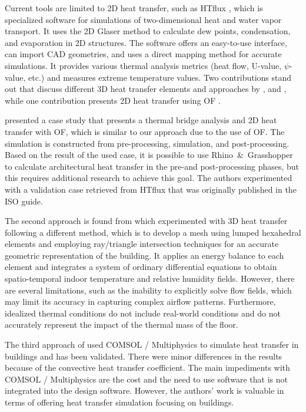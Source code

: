 Current tools are limited to 2D heat transfer, such as HTflux \cite{HTflux}, which is specialized software for simulations of two-dimensional heat and water vapor transport.
It uses the 2D Glaser method \cite{glaser1959graphisches} to calculate dew points, condensation, and evaporation in 2D structures. 
The software offers an easy-to-use interface, can import \gls{CAD} geometries, and uses a direct mapping method for accurate simulations. 
It provides various thermal analysis metrics (heat flow, U-value, $\psi$-value, etc.) and measures extreme temperature values. Two contributions stand out that discuss different 3D heat transfer elements and approaches by  \citeauthor{Yang} \cite{Yang}, and \citeauthor{COMSOL} \cite{COMSOL}, while one contribution presents 2D heat transfer using \gls{OF} \cite{kastner2020solving}.

\citeauthor{kastner2020solving} \cite{kastner2020solving} presented a case study that presents a thermal bridge analysis and 2D heat transfer with \gls{OF}, which is similar to our approach due to the use of \gls{OF}. The simulation is constructed from pre-processing, simulation, and post-processing. 
Based on the result of the used case, it is possible to use Rhino\ \&\ Grasshopper to calculate architectural heat transfer in the pre-and post-processing phases, but this requires additional research to achieve this goal. 
The authors experimented with a validation case retrieved from HTflux that was originally published in the ISO guide. 

The second approach is found from \citeauthor{Yang} \cite{Yang} which experimented with 3D heat transfer following a different method, which is to develop a mesh using lumped hexahedral elements and employing ray/triangle intersection techniques for an accurate geometric representation of the building. 
It applies an energy balance to each element and integrates a system of ordinary differential equations to obtain spatio-temporal indoor temperature and relative humidity fields. 
However, there are several limitations, such as the inability to explicitly solve flow fields, which may limit its accuracy in capturing complex airflow patterns. 
Furthermore, idealized thermal conditions do not include real-world conditions and do not accurately represent the impact of the thermal mass of the floor. 


The third approach of \citeauthor{COMSOL} \cite{COMSOL} used COMSOL / Multiphysics to simulate heat transfer in buildings and has been validated. There were minor differences in the results because of the convective heat transfer coefficient. 
The main impediments with COMSOL / Multiphysics are the cost and the need to use software that is not integrated into the design software.
However, the authors' work is valuable in terms of offering heat transfer simulation focusing on buildings.  %

